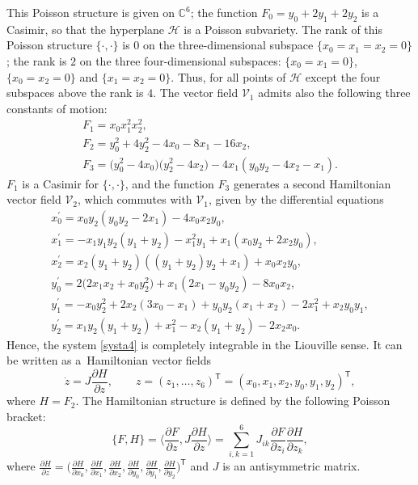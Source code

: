 \documentclass[10pt,a4paper]{amsart}
\numberwithin{equation}{section}
\begin{document}
This Poisson structure is given on $\mathbb{C}^6$; the function
$F_0=y_0 + 2y_1 + 2y_2$ is a Casimir, so that the hyperplane
$\mathcal{H}$ is a Poisson subvariety. The rank of this Poisson
structure $\{\cdot,\cdot\}$ is $0$ on the three-dimensional
subspace $\{x_0 = x_1 = x_2 = 0\}$; the rank is $2$ on the three
four-dimensional subspaces: $\{x_0 = x_1 = 0\}$, $\{x_0 = x_2 =
0\}$ and $\{x_1 = x_2 = 0\}$. Thus, for all points of
$\mathcal{H}$ except the four subspaces above the rank is $4$.
The vector field $\mathcal{V}_1$ admits also the following three
constants of motion:
\begin{gather}
 F_1=x_0x_1^2x_2^2, \nonumber\\
 F_2=y_0^2 + 4y_2^2-4x_0-8x_1-16x_2, \nonumber\\
 F_3= \bigl(y_0^2-4x_0\bigr)\bigl(y_2^2-4x_2\bigr)-4x_1(y_0y_2-4x_2-x_1).\label{invar1a4}
\end{gather}
$F_1$ is a Casimir for $\{\cdot,\cdot\}$, and the function
$F_3$ generates a second Hamiltonian vector field
$\mathcal{V}_2$, which commutes with $\mathcal{V}_1$, given by
the differential equations
\begin{gather}
x_0^{\prime}=x_0y_2(y_0y_2-2x_1)-4x_0x_2y_0, \nonumber\\
x_1^{\prime}=-x_1y_1y_2(y_1+y_2) - x_1^2y_1+x_1(x_0y_2+2x_2y_0), \nonumber\\
x_2^{\prime}=x_2(y_1+y_2)((y_1+y_2)y_2+x_1)+x_0x_2y_0, \nonumber\\
y_0^{\prime}=2\bigl(2x_1x_2+x_0y_2^2\bigr)+ x_1(2x_1-y_0y_2)-8x_0x_2, \nonumber\\
y_1^{\prime}=-x_0y_2^2+2x_2 ( 3x_0-x_1 ) +y_0y_2 (
x_1+x_2 )-2x_1^2+x_2y_0y_1, \nonumber\\
y_2^{\prime}=x_1y_2( y_1+y_2)+x_1^2-x_2( y_1+y_2)
-2x_2x_0. \label{syst3}
\end{gather}
Hence, the system \eqref{systa4} is completely integrable in the
Liouville sense. It can be written as a~Hamiltonian vector fields
\[\dot{z}=J\frac{\partial H}{\partial z},\qquad z=(z_1,\dots,z_6)^{\mathsf{T}}=( x_0
, x_1, x_2, y_0, y_1, y_2 )^{\mathsf{T}},\]
where $H=F_2$. The
Hamiltonian structure is defined by the following Poisson bracket:
\[ \{F,H\}=\biggl\langle\frac{\partial F}{\partial z}, J\frac{\partial H}
{\partial z}\biggr\rangle=\displaystyle\sum_{i,k=1}^6
J_{ik}\frac{\partial F}{\partial z_i}\frac{\partial H}{\partial
z_k},
\] where $\frac{\partial H}{\partial z}=\bigl(\frac{\partial
H}{\partial x_0},\frac{\partial H}{\partial x_1},\frac{\partial
H}{\partial x_2},\frac{\partial H}{\partial y_0},\frac{\partial
H}{\partial y_1},\frac{\partial H}{\partial y_2}\bigr)^{\mathsf{T}}$ and
$J$ is an
antisymmetric matrix.
\end{document}
